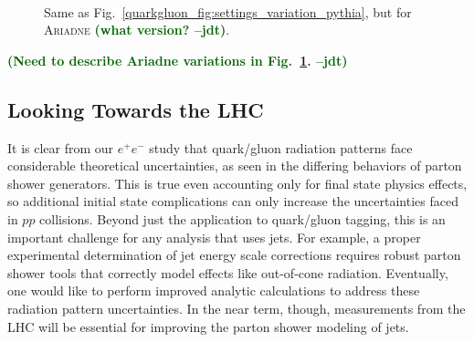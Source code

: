 \documentclass[11pt]{cernrep}
\newcommand{\jdt}[1]{\textbf{\textcolor{darkgreen}{(#1 --jdt)}}}
\begin{document}
\begin{figure}
\centering
{}
$\qquad$
\caption{Same as Fig.~\ref{quarkgluon_fig:settings_variation_pythia}, but for \textsc{Ariadne} \jdt{what version?}.}
\label{quarkgluon_fig:settings_variation_ariadne}
\end{figure}

\jdt{Need to describe Ariadne variations in Fig.~\ref{quarkgluon_fig:settings_variation_ariadne}.}


\subsection{Looking Towards the LHC}
\label{quarkgluon_sec:pp}

It is clear from our $e^+e^-$ study that quark/gluon radiation patterns face considerable theoretical uncertainties, as seen in the differing behaviors of parton shower generators.  This is true even accounting only for final state physics effects, so additional initial state complications can only increase the uncertainties faced in $pp$ collisions.  Beyond just the application to quark/gluon tagging, this is an important challenge for any analysis that uses jets.  For example, a proper experimental determination of jet energy scale corrections requires robust parton shower tools that correctly model effects like out-of-cone radiation.  Eventually, one would like to perform improved analytic calculations to address these radiation pattern uncertainties.  In the near term, though, measurements from the LHC will be essential for improving the parton shower modeling of jets.
\end{document}
